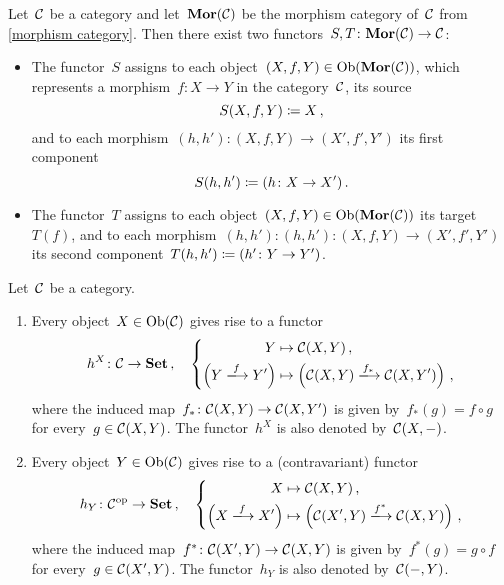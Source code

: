 \begin{example*}
  \label{source target functors}
  Let~$\mathcal{C}$ be a category and let~$\mathbf{Mor}(\mathcal{C})$ be the morphism category of~$\mathcal{C}$ from \cref{morphism category}.
  Then there exist two functors~$S, T \colon \mathbf{Mor}(\mathcal{C}) \to \mathcal{C}$:
  \begin{itemize}
    \item
      The functor~$S$ assigns to each object~$(X,f,Y) \in \operatorname{Ob}(\mathbf{Mor}(\mathcal{C}))$, which represents a morphism~$f \colon X \to Y$ in the category~$\mathcal{C}$, its source
      \[
                  S(X,f,Y)
        \coloneqq  X \,,
      \]
      and to each morphism~$(h,h') \colon (X,f,Y) \to (X',f',Y')$ its first component
      \[
                  S(h,h')
        \coloneqq  (h \colon X \to X') \,.
      \]
    \item
      The functor~$T$ assigns to each object~$(X,f,Y) \in \operatorname{Ob}(\mathbf{Mor}(\mathcal{C}))$ its target~$T(f)$, and to each morphism~$(h,h') \colon (h,h') \colon (X,f,Y) \to (X',f',Y')$ its second component~$T(h,h') \coloneqq (h' \colon Y \to Y')$.
  \end{itemize}
\end{example*}


\begin{example}
  Let~$\mathcal{C}$ be a category.
  \begin{enumerate}
    \item
      Every object~$X \in \operatorname{Ob}(\mathcal{C})$ gives rise to a functor
      \[
                h^X
        \colon  \Ccat
        \to     \Set \,,
        \quad   \left\{
                  \begin{aligned}
                              Y
                    &\mapsto  \Ccat(X,Y) \,,
                    \\
                              \left( Y \xlongto{f} Y' \right)
                    &\mapsto  \left( \Ccat(X,Y) \xlongto{f_*} \Ccat(X,Y') \right) \,,
                  \end{aligned}
                \right.
      \]
      where the induced map~$f_* \colon \mathcal{C}(X,Y) \to \mathcal{C}(X,Y')$ is given by~$f_*(g) = f \circ g$ for every~$g \in \mathcal{C}(X,Y)$.
      The functor~$h^X$ is also denoted by~$\mathcal{C}(X,-)$.
    \item
      Every object~$Y \in \operatorname{Ob}(\mathcal{C})$ gives rise to a (contravariant) functor
      \[
                h_Y
        \colon  \Ccat^\op
        \to     \Set \,,
        \quad   \left\{
                  \begin{aligned}
                              X
                    &\mapsto  \Ccat(X,Y) \,,
                    \\
                              \left( X \xlongto{f} X' \right)
                    &\mapsto  \left( \Ccat(X',Y) \xlongto{f^*} \Ccat(X,Y) \right) \,,
                  \end{aligned}
                \right.
      \]
      where the induced map~$f^* \colon \mathcal{C}(X',Y) \to \mathcal{C}(X,Y)$ is given by~$f^*(g) = g \circ f$ for every~$g \in \mathcal{C}(X',Y)$.
      The functor~$h_Y$ is also denoted by~$\mathcal{C}(-,Y)$.
  \end{enumerate}
\end{example}


